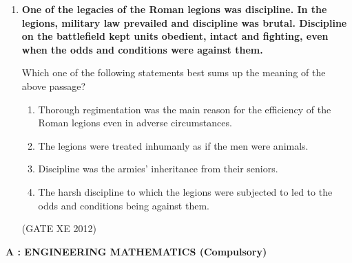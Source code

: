 \documentclass[12pt]{article}
\begin{document}
\begin{enumerate}
(GATE XE 2012)

\item \textbf{One of the legacies of the Roman legions was discipline. In the legions, military law prevailed and discipline was brutal. Discipline on the battlefield kept units obedient, intact and fighting, even when the odds and conditions were against them.}  

Which one of the following statements best sums up the meaning of the above passage?  

\begin{enumerate}
\item Thorough regimentation was the main reason for the efficiency of the Roman legions even in adverse circumstances.  
\item The legions were treated inhumanly as if the men were animals.  
\item Discipline was the armies’ inheritance from their seniors.  
\item The harsh discipline to which the legions were subjected to led to the odds and conditions being against them.  
\end{enumerate}

(GATE XE 2012)
\end{enumerate}

\newpage

\begin{center}
{\Large \textbf{A : ENGINEERING MATHEMATICS (Compulsory)}}
\end{center}
\end{document}
